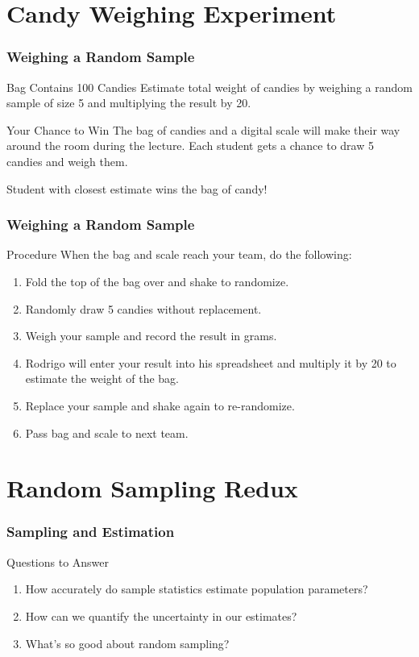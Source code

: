 \section{Candy Weighing Experiment}
\begin{frame}
\frametitle{Weighing a Random Sample}
\begin{block}{Bag Contains 100 Candies}
Estimate total weight of candies by weighing a random sample of size 5 and multiplying the result by 20.
\end{block}
\begin{block}{Your Chance to Win}
The bag of candies and a digital scale will make their way around the room \alert{during the lecture}. Each student gets a chance to draw 5 candies and weigh them.
\end{block}
\begin{alertblock}{Student with closest estimate wins the bag of candy!}
\end{alertblock}

\end{frame}
\begin{frame}
\frametitle{Weighing a Random Sample}
\begin{block}{Procedure}
When the bag and scale reach your team, do the following:
\end{block}
\begin{enumerate}
\item Fold the top of the bag over and shake to randomize.
\item Randomly draw 5 candies \alert{without replacement}.
\item Weigh your sample and record the result \alert{in grams}.
\item Rodrigo will enter your result into his spreadsheet and multiply it by 20 to estimate the weight of the bag.
\item Replace your sample and shake again to re-randomize.
\item Pass bag and scale to next team.
\end{enumerate}
\end{frame}


\section{Random Sampling Redux}
\begin{frame}
  \frametitle{Sampling and Estimation}
  \begin{block}{Questions to Answer}
  \begin{enumerate}
    \item How accurately do sample statistics estimate population parameters?
    \item How can we quantify the uncertainty in our estimates?
    \item What's so good about random sampling?
  \end{enumerate}
  \end{block}
\end{frame}

